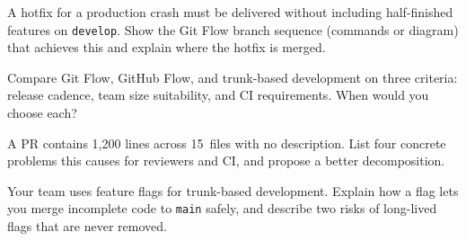 \begin{exercise}
A hotfix for a production crash must be delivered without including half-finished features on \texttt{develop}. Show the Git Flow branch sequence (commands or diagram) that achieves this and explain where the hotfix is merged.
\end{exercise}

\begin{exercise}
Compare Git Flow, GitHub Flow, and trunk-based development on three criteria: release cadence, team size suitability, and CI requirements. When would you choose each?
\end{exercise}

\begin{exercise}
A PR contains 1{,}200 lines across 15~files with no description. List four concrete problems this causes for reviewers and CI, and propose a better decomposition.
\end{exercise}

\begin{exercise}
Your team uses feature flags for trunk-based development. Explain how a flag lets you merge incomplete code to \texttt{main} safely, and describe two risks of long-lived flags that are never removed.
\end{exercise}
